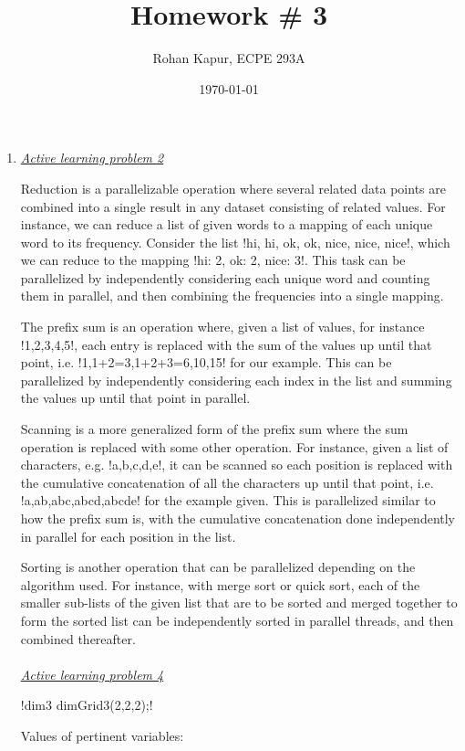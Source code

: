 \documentclass[11pt,twoside]{article}
\title{Homework \# 3}
\author{Rohan Kapur, ECPE 293A}
\date{\today}
\begin{document}
\maketitle

\begin{enumerate}
  \item \underline{\textit{Active learning problem 2}}
		\par\indent Reduction is a parallelizable operation where several related data points are combined into a single result in any dataset consisting of related values. For instance, we can reduce a list of given words to a mapping of each unique word to its frequency. Consider the list !{hi, hi, ok, ok, nice, nice, nice}!, which we can reduce to the mapping !{hi: 2, ok: 2, nice: 3}!. This task can be parallelized by independently considering each unique word and counting them in parallel, and then combining the frequencies into a single mapping.
		\par\indent The prefix sum is an operation where, given a list of values, for instance !{1,2,3,4,5}!, each entry is replaced with the sum of the values up until that point, i.e. !{1,1+2=3,1+2+3=6,10,15}! for our example. This can be parallelized by independently considering each index in the list and summing the values up until that point in parallel.
		\par\indent Scanning is a more generalized form of the prefix sum where the sum operation is replaced with some other operation. For instance, given a list of characters, e.g. !{a,b,c,d,e}!, it can be scanned so each position is replaced with the cumulative concatenation of all the characters up until that point, i.e. !{a,ab,abc,abcd,abcde}! for the example given. This is parallelized similar to how the prefix sum is, with the cumulative concatenation done independently in parallel for each position in the list.
		\par\indent Sorting is another operation that can be parallelized depending on the algorithm used. For instance, with merge sort or quick sort, each of the smaller sub-lists of the given list that are to be sorted and merged together to form the sorted list can be independently sorted in parallel threads, and then combined thereafter.
		\\ \hbox{} \\
		\underline{\textit{Active learning problem 4}}
		\par\indent !dim3 dimGrid3(2,2,2);!
		\par\indent Values of pertinent variables:\\

\end{enumerate}
\end{document}
